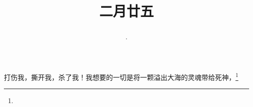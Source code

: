 \title{\date[d=3,m=4,y=2024][year:cn-y,年,month:cn,day:cn,日,·,weekday]·二月廿五 }
打伤我，撕开我，杀了我！我想要的一切是将一颗溢出大海的灵魂带给死神，\footnote{ }

